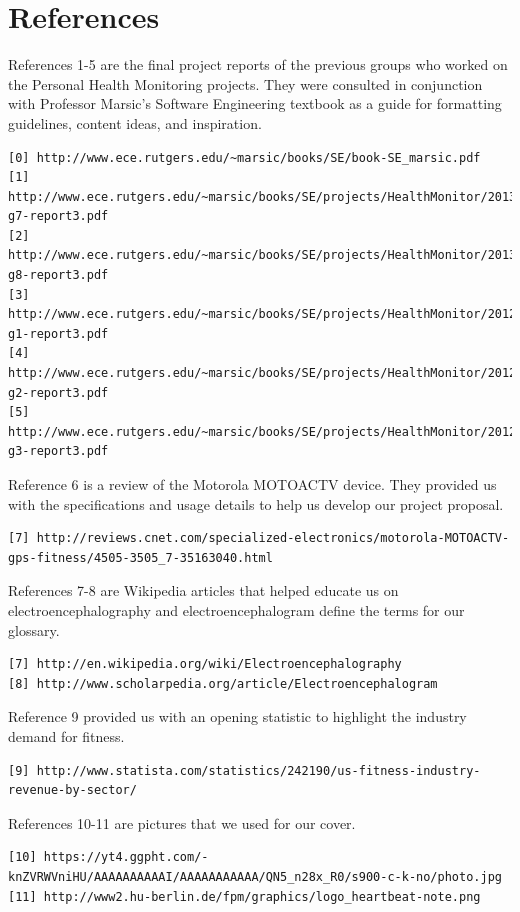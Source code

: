 \documentclass[letterpaper,english, 12pt]{scrreprt}
\begin{document}
\chapter*{References}

References 1-5 are the final project reports of the previous groups who worked on the Personal Health Monitoring projects. They were consulted in conjunction with Professor Marsic's Software Engineering textbook as a guide for formatting guidelines, content ideas, and inspiration. 
\begin{verbatim}
[0] http://www.ece.rutgers.edu/~marsic/books/SE/book-SE_marsic.pdf
[1] http://www.ece.rutgers.edu/~marsic/books/SE/projects/HealthMonitor/2013-g7-report3.pdf
[2] http://www.ece.rutgers.edu/~marsic/books/SE/projects/HealthMonitor/2013-g8-report3.pdf
[3] http://www.ece.rutgers.edu/~marsic/books/SE/projects/HealthMonitor/2012-g1-report3.pdf
[4] http://www.ece.rutgers.edu/~marsic/books/SE/projects/HealthMonitor/2012-g2-report3.pdf
[5] http://www.ece.rutgers.edu/~marsic/books/SE/projects/HealthMonitor/2012-g3-report3.pdf
\end{verbatim}
Reference 6 is a review of the Motorola MOTOACTV device. They provided us with the specifications and usage details to help us develop our project proposal.
\begin{verbatim}
[7] http://reviews.cnet.com/specialized-electronics/motorola-MOTOACTV-gps-fitness/4505-3505_7-35163040.html
\end{verbatim}

References 7-8 are Wikipedia articles that helped educate us on electroencephalography and electroencephalogram define the terms for our glossary.
\begin{verbatim}
[7] http://en.wikipedia.org/wiki/Electroencephalography
[8] http://www.scholarpedia.org/article/Electroencephalogram
\end{verbatim}

Reference 9 provided us with an opening statistic to highlight the industry demand for fitness.
\begin{verbatim}
[9] http://www.statista.com/statistics/242190/us-fitness-industry-revenue-by-sector/
\end{verbatim}

References 10-11 are pictures that we used for our cover.
\begin{verbatim}
[10] https://yt4.ggpht.com/-knZVRWVniHU/AAAAAAAAAAI/AAAAAAAAAAA/QN5_n28x_R0/s900-c-k-no/photo.jpg
[11] http://www2.hu-berlin.de/fpm/graphics/logo_heartbeat-note.png
\end{verbatim}
\end{document}
